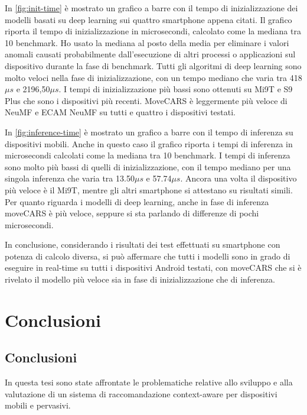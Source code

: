 \documentclass[12pt,italian]{report}
\begin{document}
\noindent In \autoref{fig:init-time} è mostrato un grafico a barre con il tempo di inizializzazione dei modelli basati su deep learning sui quattro smartphone appena citati. Il grafico riporta il tempo di inizializzazione in microsecondi, calcolato come la mediana tra 10 benchmark. Ho usato la mediana al posto della media per eliminare i valori anomali causati probabilmente dall'esecuzione di altri processi o applicazioni sul dispositivo durante la fase di benchmark. Tutti gli algoritmi di deep learning sono molto veloci nella fase di inizializzazione, con un tempo mediano che varia tra 418$\mu s$ e 2196,50$\mu s$. I tempi di inizializzazione più bassi sono ottenuti su Mi9T e S9 Plus che sono i dispositivi più recenti. MoveCARS è leggermente più veloce di NeuMF e ECAM NeuMF su tutti e quattro i dispositivi testati.

In \autoref{fig:inference-time} è mostrato un grafico a barre con il tempo di inferenza su dispositivi mobili. Anche in questo caso il grafico riporta i tempi di inferenza in microsecondi calcolati come la mediana tra 10 benchmark. I tempi di inferenza sono molto più bassi di quelli di inizializzazione, con il tempo mediano per una singola inferenza che varia tra 13.50$\mu s$ e 57.74$\mu s$. Ancora una volta il dispositivo più veloce è il Mi9T, mentre gli altri smartphone si attestano su risultati simili. Per quanto riguarda i modelli di deep learning, anche in fase di inferenza moveCARS è più veloce, seppure si sta parlando di differenze di pochi microsecondi. 

In conclusione, considerando i risultati dei test effettuati su smartphone con potenza di calcolo diversa, si può affermare che tutti i modelli sono in grado di eseguire in real-time su tutti i dispositivi Android testati, con moveCARS che si è rivelato il modello più veloce sia in fase di inizializzazione che di inferenza.


% 
% 

\chapter{Conclusioni} \label{chap:conclusioni}

\section{Conclusioni}
In questa tesi sono state affrontate le problematiche relative allo sviluppo e alla valutazione di un sistema di raccomandazione context-aware per dispositivi mobili e pervasivi.
\end{document}
